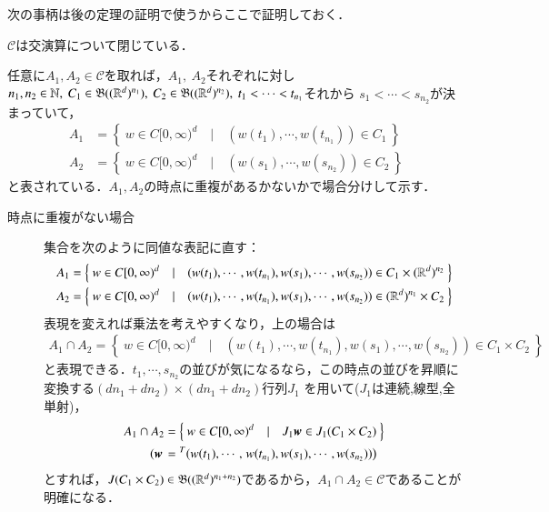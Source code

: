 次の事柄は後の定理の証明で使うからここで証明しておく．
\begin{screen}
	\begin{thm}
		$\mathscr{C}$は交演算について閉じている．
	\end{thm}
\end{screen}
\begin{prf}
	任意に$A_1, A_2 \in \mathscr{C}$を取れば，$A_1,\ A_2$それぞれに対し
	$n_1,n_2 \in \N,\ C_1 \in \borel{(\R^d)^{n_1}},\ C_2 \in \borel{(\R^d)^{n_2}},\ t_1<\cdots<t_{n_1}$それから
	$s_1<\cdots<s_{n_2}$が決まっていて，
	\begin{align}
		A_1 &= \left\{\ w \in C[0,\infty)^d\quad |\quad (w(t_1), \cdots, w(t_{n_1})) \in C_1\ \right\} \\
		A_2 &= \left\{\ w \in C[0,\infty)^d\quad |\quad (w(s_1), \cdots, w(s_{n_2})) \in C_2\ \right\}
	\end{align}
	と表されている．$A_1,A_2$の時点に重複があるかないかで場合分けして示す．
	\begin{description}
	\item[時点に重複がない場合]
		集合を次のように同値な表記に直す：
		\begin{align}
			A_1 &= \left\{\ w \in C[0,\infty)^d\quad |\quad (w(t_1), \cdots, w(t_{n_1}),w(s_1), \cdots, w(s_{n_2})) \in C_1 \times (\mathbb{R}^d)^{n_2}\ \right\} \\
			A_2 &= \left\{\ w \in C[0,\infty)^d\quad |\quad (w(t_1), \cdots, w(t_{n_1}),w(s_1), \cdots, w(s_{n_2})) \in (\mathbb{R}^d)^{n_1} \times C_2\ \right\}
		\end{align}
		表現を変えれば乗法を考えやすくなり，上の場合は
		\begin{align}
			A_1 \cap A_2 = \left\{\ w \in C[0,\infty)^d\quad |\quad (w(t_1), \cdots, w(t_{n_1}),w(s_1), \cdots, w(s_{n_2})) \in C_1 \times C_2\ \right\}
		\end{align}
		と表現できる．$t_1,\cdots,s_{n_2}$の並びが気になるなら，この時点の並びを昇順に変換する$(dn_1 + dn_2) \times (dn_1 + dn_2)$行列$J_1$
		を用いて($J_1$は連続,線型,全単射)，
		\begin{align}
			A_1 \cap A_2 &= \left\{\ w \in C[0,\infty)^d\quad |\quad J_1\mbox{\boldmath $w$} \in J_1(C_1 \times C_2)\ \right\} \\
			\left(\mbox{\boldmath $w$} \right.&= {}^{T}(w(t_1), \cdots, \left.w(t_{n_1}),w(s_1), \cdots, w(s_{n_2}))\right)
		\end{align}
		とすれば，$J(C_1 \times C_2) \in \mathfrak{B}((\mathbb{R}^d)^{n_1 + n_2})$であるから，$A_1 \cap A_2 \in \mathscr{C}$であることが明確になる．
	

\end{description}
\end{prf}
